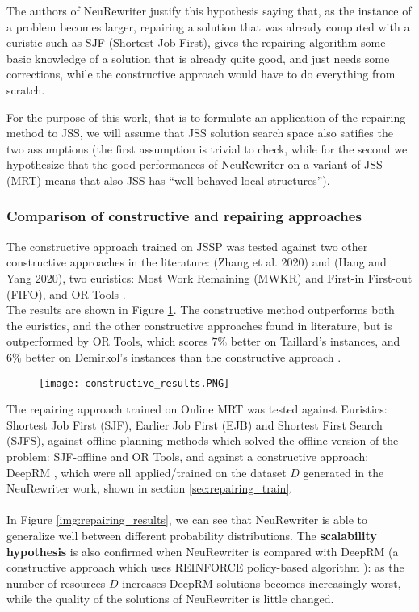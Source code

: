 \documentclass[12pt]{article}
\begin{document}
\medbreak
The authors of NeuRewriter \cite{neu_rewriter} justify this hypothesis saying that, as the instance of a problem becomes larger, repairing a solution that was already computed with a euristic such as SJF (Shortest Job First), gives the repairing algorithm some basic knowledge of a solution that is already quite good, and just needs some corrections, while the constructive approach would have to do everything from scratch.

\medbreak
For the purpose of this work, that is to formulate an application of the repairing method to JSS, we will assume that JSS solution search space also satifies the two assumptions (the first assumption is trivial to check, while for the second we hypothesize that the good performances of NeuRewriter on a variant of JSS (MRT) means that also JSS has ``well-behaved local structures'').


\subsubsection{Comparison of constructive and repairing approaches}
The constructive approach trained on JSSP \cite{pierre_constructive_approach} was tested against two other constructive approaches in the literature: (Zhang et al. 2020) and (Hang and Yang 2020), two euristics: Most Work Remaining (MWKR) and First-in First-out (FIFO), and OR Tools \cite{or_tools}.\\
The results are shown in Figure \ref{img:constructive_results}. The constructive method outperforms both the euristics, and the other constructive approaches found in literature, but is outperformed by OR Tools, which scores $7\%$ better on Taillard's instances, and $6\%$ better on Demirkol's instances than the constructive approach \cite{pierre_constructive_approach}.

\begin{figure}[H]
    \centering
    \texttt{[image: constructive\_results.PNG]}
    \caption{}
    \label{img:constructive_results}
\end{figure}
The repairing approach trained on Online MRT was tested against Euristics: Shortest Job First (SJF), Earlier Job First (EJB) and Shortest First Search (SJFS), 
against offline planning methods which solved the offline version of the problem: SJF-offline and OR Tools, and against a constructive approach: DeepRM \cite{deep_rm}, 
which were all applied/trained on the dataset $D$ generated in the NeuRewriter work, shown in section \ref{sec:repairing_train}.\\
\\
In Figure \ref{img:repairing_results}, we can see that NeuRewriter is able to generalize well between different probability distributions. 
The \textbf{scalability hypothesis} is also confirmed when NeuRewriter is compared with DeepRM (a constructive approach which uses REINFORCE policy-based algorithm \cite{rl_introduction}): as the number of resources $D$ increases DeepRM solutions becomes increasingly worst, while the quality of the solutions of NeuRewriter is little changed.
\end{document}
